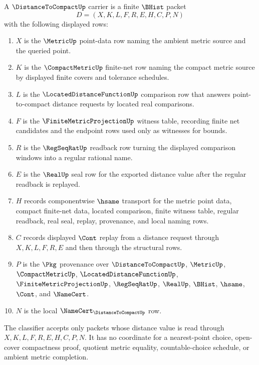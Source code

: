 \begin{definition}
\label{def:distance-to-compact-carrier}
A $\DistanceToCompactUp$ carrier is a finite $\BHist$ packet
$$
D=(X,K,L,F,R,E,H,C,P,N)
$$
with the following displayed rows:
\begin{enumerate}
\item $X$ is the $\MetricUp$ point-data row naming the ambient metric source and the queried point.
\item $K$ is the $\CompactMetricUp$ finite-net row naming the compact metric source by displayed finite covers and tolerance schedules.
\item $L$ is the $\LocatedDistanceFunctionUp$ comparison row that answers point-to-compact distance requests by located real comparisons.
\item $F$ is the $\FiniteMetricProjectionUp$ witness table, recording finite net candidates and the endpoint rows used only as witnesses for bounds.
\item $R$ is the $\RegSeqRatUp$ readback row turning the displayed comparison windows into a regular rational name.
\item $E$ is the $\RealUp$ seal row for the exported distance value after the regular readback is replayed.
\item $H$ records componentwise $\hsame$ transport for the metric point data, compact finite-net data, located comparison, finite witness table, regular readback, real seal, replay, provenance, and local naming rows.
\item $C$ records displayed $\Cont$ replay from a distance request through $X,K,L,F,R,E$ and then through the structural rows.
\item $P$ is the $\Pkg$ provenance over $\DistanceToCompactUp$, $\MetricUp$, $\CompactMetricUp$, $\LocatedDistanceFunctionUp$, $\FiniteMetricProjectionUp$, $\RegSeqRatUp$, $\RealUp$, $\BHist$, $\hsame$, $\Cont$, and $\NameCert$.
\item $N$ is the local $\NameCert_{\DistanceToCompactUp}$ row.
\end{enumerate}
The classifier accepts only packets whose distance value is read through $X,K,L,F,R,E,H,C,P,N$. It has no coordinate for a nearest-point choice, open-cover compactness proof, quotient metric equality, countable-choice schedule, or ambient metric completion.
\end{definition}

